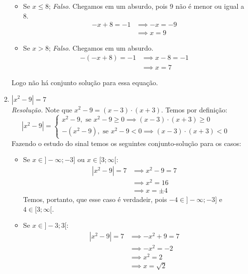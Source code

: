 \begin{enumerate}
\begin{itemize}
        \item Se $x \le 8$; \emph{Falso}. Chegamos em um absurdo, pois 9 não é menor ou igual a 8.
        \begin{align*}
            -x + 8 = -1 & \implies -x = -9 \\ & \implies x = 9
        \end{align*}
        \item Se $x > 8$; \emph{Falso}. Chegamos em um absurdo.
        \begin{align*}
            -(-x + 8) = -1 & \implies x - 8 = -1 \\ & \implies x = 7 
        \end{align*}
    \end{itemize}
    Logo não há conjunto solução para essa equação.
    \item $|x^2 - 9| = 7$
    \\ \emph{Resolução.} Note que $x^2 - 9 = (x - 3) \cdot (x + 3)$. Temos por definição:
    \begin{displaymath}
        |x^2 - 9| = \left\{\begin{array}{cc}
             x^2 - 9, \text{ se } x^2 - 9 \ge 0 \implies (x - 3) \cdot (x + 3) \ge 0 &  \\
             - (x^2 - 9), \text{ se } x^2 - 9 < 0 \implies (x - 3) \cdot (x + 3) < 0 & 
        \end{array} \right.
    \end{displaymath}
    Fazendo o estudo do sinal temos os seguintes conjunto-solução para os casos:
    \begin{itemize}
        \item Se $x \in ]-\infty; -3]$ ou $x \in [3; \infty[$:
        \begin{align*}
            |x^2 - 9| = 7 & \implies x^2 - 9 = 7 \\ & \implies
            x^2 = 16 \\ & \implies
            x = \pm 4
        \end{align*}
        Temos, portanto, que esse caso é verdadeir, pois $-4 \in ]-\infty; -3]$ e $4 \in [3; \infty[$.
        \item Se $x \in ]-3; 3[$:
        \begin{align*}
            |x^2 - 9| = 7 & \implies -x^2 + 9 = 7 \\ & \implies
            -x^2 = -2 \\ & \implies
            x^2 = 2 \\ & \implies
            x = \sqrt{2}
        \end{align*}

\end{itemize}
\end{enumerate}
